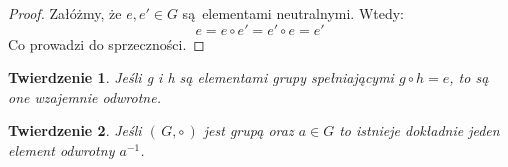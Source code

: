 \documentclass{article}
\newtheorem{theorem}{Twierdzenie}[section]
\begin{document}
    \begin{proof}
        Załóżmy, że $e, e' \in G$ są elementami neutralnymi. Wtedy:
        \begin{equation*}
            e = e \circ e' = e' \circ e = e'
        \end{equation*}
        Co prowadzi do sprzeczności.
    \end{proof}

    \begin{theorem}
        Jeśli g i h są elementami grupy spełniającymi $g \circ h = e$, to są one wzajemnie odwrotne.
    \end{theorem}

    \begin{theorem}
        Jeśli $(\, G, \circ\, )$ jest grupą oraz $a \in G$ to istnieje dokładnie jeden element odwrotny $a^{-1}$.
    \end{theorem}
\end{document}
